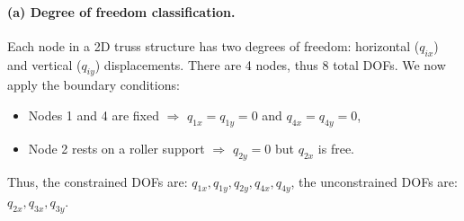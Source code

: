 \documentclass[12pt]{article}
\begin{document}
\paragraph*{(a) Degree of freedom classification.} Each node in a 2D truss structure has two degrees of freedom: horizontal ($q_{ix}$) and vertical ($q_{iy}$) displacements. There are 4 nodes, thus $8$ total DOFs. We now apply the boundary conditions:
\begin{itemize}
	\item Nodes 1 and 4 are fixed $\Rightarrow$ $q_{1x} = q_{1y} = 0$ and $q_{4x} = q_{4y} = 0$,
	\item Node 2 rests on a roller support $\Rightarrow$ $q_{2y}= 0$ but $q_{2x}$ is free.
\end{itemize}
Thus, the constrained DOFs are: $q_{1x}, q_{1y}, q_{2y}, q_{4x}, q_{4y}$, the unconstrained DOFs are: \(q_{2x}, q_{3x}, q_{3y}\).
\end{document}
